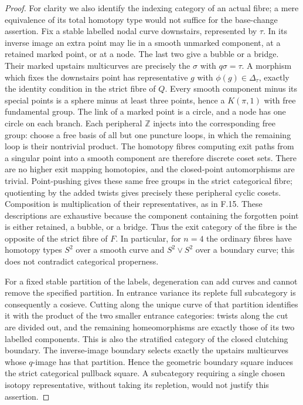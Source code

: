 \begin{proof}
For clarity we also identify the indexing category of an actual fibre; a mere equivalence of its total homotopy type would not suffice for the base-change assertion. Fix a stable labelled nodal curve downstairs, represented by $\tau$. In its inverse image an extra point may lie in a smooth unmarked component, at a retained marked point, or at a node. The last two give a bubble or a bridge. Their marked upstairs multicurves are precisely the $\sigma$ with $q\sigma=\tau$. A morphism which fixes the downstairs point has representative $g$ with $\phi(g)\in\Delta_\tau$, exactly the identity condition in the strict fibre of $Q$. Every smooth component minus its special points is a sphere minus at least three points, hence a $K(\pi,1)$ with free fundamental group. The link of a marked point is a circle, and a node has one circle on each branch. Each peripheral $\mathbb Z$ injects into the corresponding free group: choose a free basis of all but one puncture loops, in which the remaining loop is their nontrivial product. The homotopy fibres computing exit paths from a singular point into a smooth component are therefore discrete coset sets. There are no higher exit mapping homotopies, and the closed-point automorphisms are trivial. Point-pushing gives these same free groups in the strict categorical fibre; quotienting by the added twists gives precisely these peripheral cyclic cosets. Composition is multiplication of their representatives, as in F.15. These descriptions are exhaustive because the component containing the forgotten point is either retained, a bubble, or a bridge. Thus the exit category of the fibre is the opposite of the strict fibre of $F$. In particular, for $n=4$ the ordinary fibres have homotopy types $S^2$ over a smooth curve and $S^2\vee S^2$ over a boundary curve; this does not contradict categorical properness.

For a fixed stable partition of the labels, degeneration can add curves and cannot remove the specified partition. In entrance variance its replete full subcategory is consequently a cosieve. Cutting along the unique curve of that partition identifies it with the product of the two smaller entrance categories: twists along the cut are divided out, and the remaining homeomorphisms are exactly those of its two labelled components. This is also the stratified category of the closed clutching boundary. The inverse-image boundary selects exactly the upstairs multicurves whose $q$-image has that partition. Hence the geometric boundary square induces the strict categorical pullback square. A subcategory requiring a single chosen isotopy representative, without taking its repletion, would not justify this assertion.


\end{proof}
